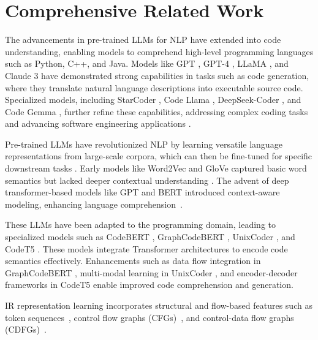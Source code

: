 \section{Comprehensive Related Work}
The advancements in pre-trained LLMs for NLP have extended into code understanding, enabling models to comprehend high-level programming languages such as Python, C++, and Java. Models like GPT \cite{brown2020gpt3}, GPT-4 \cite{openai2023gpt4}, LLaMA \cite{touvron2023llama}, and Claude 3 \cite{claude3} have demonstrated strong capabilities in tasks such as code generation, where they translate natural language descriptions into executable source code. Specialized models, including StarCoder \cite{li2023starcoder}, Code Llama \cite{rozière2024codellamaopenfoundation}, DeepSeek-Coder \cite{guo2024deepseek}, and Code Gemma \cite{team2024codegemma}, further refine these capabilities, addressing complex coding tasks and advancing software engineering applications \cite{zhao2023survey}.

Pre-trained LLMs have revolutionized NLP by learning versatile language representations from large-scale corpora, which can then be fine-tuned for specific downstream tasks \cite{qiu2020pretrainModel}. Early models like Word2Vec \cite{mikolov2013efficient} and GloVe \cite{pennington2014glove} captured basic word semantics but lacked deeper contextual understanding \cite{han2021pre}. The advent of deep transformer-based models like GPT \cite{radford2019gpt} and BERT \cite{devlin2018bert} introduced context-aware modeling, enhancing language comprehension~\cite{vaswani2017attention}.

These LLMs have been adapted to the programming domain, leading to specialized models such as CodeBERT \cite{feng2020codebert}, GraphCodeBERT \cite{guo2020graphcodebert}, UnixCoder \cite{guo2022unixcoder}, and CodeT5 \cite{wang2021codet5}. These models integrate Transformer architectures to encode code semantics effectively. Enhancements such as data flow integration in GraphCodeBERT \cite{guo2020graphcodebert}, multi-modal learning in UnixCoder \cite{guo2022unixcoder}, and encoder-decoder frameworks in CodeT5 \cite{wang2021codet5} enable improved code comprehension and generation.

IR representation learning incorporates structural and flow-based features such as token sequences~\cite{peng2021could}, control flow graphs (CFGs)~\cite{2020ir2vec, yu2020codecmr}, and control-data flow graphs (CDFGs)~\cite{ben2018neural, brauckmann2020compiler, cummins2021programl}.

